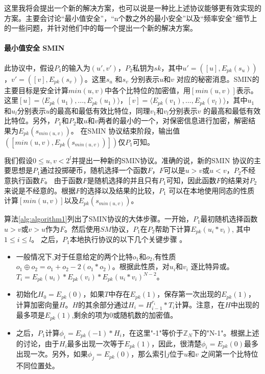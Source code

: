 这里我将会提出一个新的解决方案，也可以说是一种比上述协议能够更有效实现的方案。主要会讨论“最小值安全”，“n个数之外的最小安全”以及“频率安全”细节上的一些问题，并针对他们中的每一个提出一个新的解决方案。
\paragraph{最小值安全 SMIN} 此协议中，假设$P_1$的输入为$(u',v')$，$P_2$私钥为$sk$，其中$u'=([u],E_{pk}(s_u))$，$v'=([v],E_{pk}(s_v))$。这里$s_u$ 和$s_v$ 分别表示$u$和$v$ 对应的秘密消息。SMIN的主要目标是安全计算$min(u,v)$中各个比特位的加密值，用$[min(u,v)]$表示。这里$[u]=\langle E_{pk}(u_1),...,E_{pk}(u_1)\rangle$，$[v]=\langle E_{pk}(v_1),...,E_{pk}(v_l)\rangle$，其中$u_1$和$u_l$分别表示$u$的最高和最低有效比特位，同理$v_1$和$v_l$分别表示$v$ 的最高和最低有效比特位。另外，$P_1$和$P_2$取$u$和$v$两者的最小的一个，对保密信息进行加密，解密结果为$E_{pk}(s_{min(u,v)})$。 在SMIN 协议结束阶段，输出值$([min(u,v),E_{pk}(s_{min(u,v)})])$仅$P_1$可知。

我们假设$0\leq u,v < 2^l$并提出一种新的SMIN协议。准确的说，新的SMIN 协议的主要思想是$P_1$通过投掷硬币，随机选择一个函数$F$，$F$可以是$u>v$或$u<v$，$P_2$不经意执行函数$F$。 由于函数$F$是随机选择的并且只有$P_1$可知，因此函数$F$的结果对$P_2$来说是不经意的。根据$F$的选择以及结果的比较，$P_1$ 可以在本地使用同态的性质计算$[min(u,v)]$以及$E_{pk}(s_{min(u,v)})$。


算法\ref{alg:algorithm1}列出了SMIN协议的大体步骤。一开始，$P_1$最初随机选择函数$u>v$或$v>u$作为$F$。然后使用$SM$协议，$P_1$在$P_2$帮助下计算$E_{pk}(u_i*v_i)$, 其中$1\leq i\leq l$。 之后，$P_1$本地执行协议的以下几个关键步骤 。
\begin{itemize}
\item 一般情况下,对于任意给定的两个比特$o_1$和$o_2$,有性质$o_1 \oplus o_2=o_1+o_2-2(o_1 * o_2)$。根据此性质，对$u_i$和$v_i$
    逐比特异或。$T_i = E_{pk}(u_i)*E_{pk}(v_i)*E_{pk}(u_i * v_i)^{N-2}$。

\item 初始化$H_0=E_{pk}(0)$，如果$T$中存在$E_{pk}(1)$，保存第一次出现的$E_{pk}(1)$，计算加密向量$H$。$H$的其余部分通过$H_i=H^{r_i}_{i-1} * T_i$计算。注意，在$H$中出现的最多项是$E_{pk}(1)$,剩余的项为0或随机数的加密值。

\item 之后，$P_1$计算${\phi}_i = E_{pk}(-1) * H_i $，在这里"-1"等价于${\mathbb{Z}}_N$下的"N-1"。根据上述的讨论，由于$H_i$最多出现一次等于$E_{pk}(1)$，因此，很清楚${\phi}_i = E_{pk}(0)$最多出现一次。另外，如果${\phi}_j = E_{pk}(0)$，那么索引$j$位于$u$和$v$ 之间第一个比特位不同位置处。
\end{itemize}

